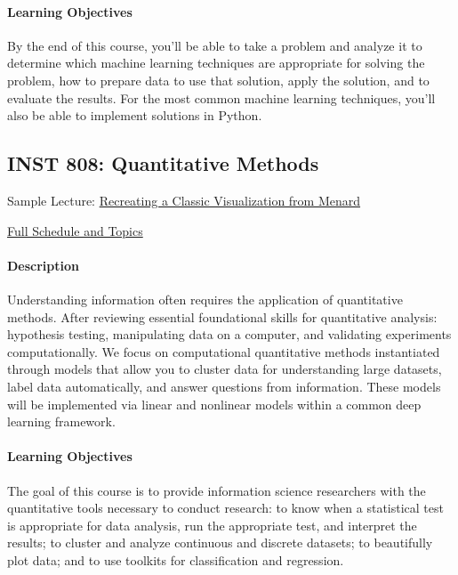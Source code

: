 \documentclass{article}
\begin{document}
\paragraph{Learning Objectives} By the end of this course, you’ll be able to take a problem and analyze it to determine which machine learning techniques are appropriate for solving the problem, how to prepare data to use that solution, apply the solution, and to evaluate the results.  For the most common machine learning techniques, you’ll also be able to implement solutions in Python.



\subsection{INST 808: Quantitative Methods}

\begin{itemize*}
\item Sample Lecture: \href{https://www.youtube.com/watch?v=-lgKvN6kGBk}{Recreating a Classic Visualization from Menard}
  \item \href{http://users.umiacs.umd.edu/~jbg/teaching/INST_808/}{Full Schedule and Topics}
  \end{itemize*}


\paragraph{Description}
Understanding information often requires the application of quantitative methods.  After reviewing essential foundational skills for quantitative analysis: hypothesis testing, manipulating data on a computer, and validating experiments computationally.  We focus on computational quantitative methods instantiated through models that allow you to cluster data for understanding large datasets, label data automatically, and answer questions from information.  These models will be implemented via linear and nonlinear models within a common deep learning framework.

\paragraph{Learning Objectives}
The goal of this course is to provide information science researchers with the quantitative tools necessary to conduct research: to know when a statistical test is appropriate for data analysis, run the appropriate test, and interpret the results; to cluster and analyze continuous and discrete datasets; to beautifully plot data; and to use toolkits for classification and regression.
\end{document}

